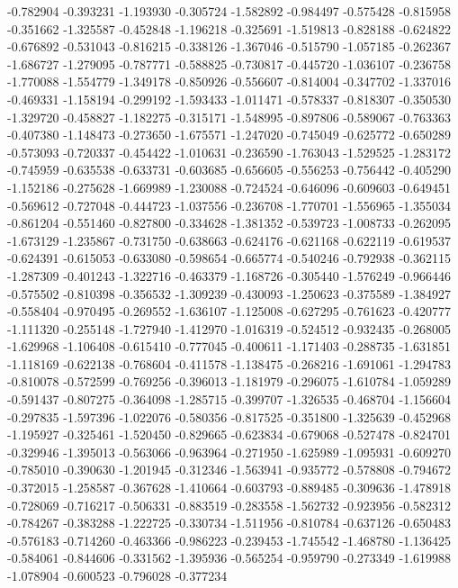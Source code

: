 -0.782904
-0.393231
-1.193930
-0.305724
-1.582892
-0.984497
-0.575428
-0.815958
-0.351662
-1.325587
-0.452848
-1.196218
-0.325691
-1.519813
-0.828188
-0.624822
-0.676892
-0.531043
-0.816215
-0.338126
-1.367046
-0.515790
-1.057185
-0.262367
-1.686727
-1.279095
-0.787771
-0.588825
-0.730817
-0.445720
-1.036107
-0.236758
-1.770088
-1.554779
-1.349178
-0.850926
-0.556607
-0.814004
-0.347702
-1.337016
-0.469331
-1.158194
-0.299192
-1.593433
-1.011471
-0.578337
-0.818307
-0.350530
-1.329720
-0.458827
-1.182275
-0.315171
-1.548995
-0.897806
-0.589067
-0.763363
-0.407380
-1.148473
-0.273650
-1.675571
-1.247020
-0.745049
-0.625772
-0.650289
-0.573093
-0.720337
-0.454422
-1.010631
-0.236590
-1.763043
-1.529525
-1.283172
-0.745959
-0.635538
-0.633731
-0.603685
-0.656605
-0.556253
-0.756442
-0.405290
-1.152186
-0.275628
-1.669989
-1.230088
-0.724524
-0.646096
-0.609603
-0.649451
-0.569612
-0.727048
-0.444723
-1.037556
-0.236708
-1.770701
-1.556965
-1.355034
-0.861204
-0.551460
-0.827800
-0.334628
-1.381352
-0.539723
-1.008733
-0.262095
-1.673129
-1.235867
-0.731750
-0.638663
-0.624176
-0.621168
-0.622119
-0.619537
-0.624391
-0.615053
-0.633080
-0.598654
-0.665774
-0.540246
-0.792938
-0.362115
-1.287309
-0.401243
-1.322716
-0.463379
-1.168726
-0.305440
-1.576249
-0.966446
-0.575502
-0.810398
-0.356532
-1.309239
-0.430093
-1.250623
-0.375589
-1.384927
-0.558404
-0.970495
-0.269552
-1.636107
-1.125008
-0.627295
-0.761623
-0.420777
-1.111320
-0.255148
-1.727940
-1.412970
-1.016319
-0.524512
-0.932435
-0.268005
-1.629968
-1.106408
-0.615410
-0.777045
-0.400611
-1.171403
-0.288735
-1.631851
-1.118169
-0.622138
-0.768604
-0.411578
-1.138475
-0.268216
-1.691061
-1.294783
-0.810078
-0.572599
-0.769256
-0.396013
-1.181979
-0.296075
-1.610784
-1.059289
-0.591437
-0.807275
-0.364098
-1.285715
-0.399707
-1.326535
-0.468704
-1.156604
-0.297835
-1.597396
-1.022076
-0.580356
-0.817525
-0.351800
-1.325639
-0.452968
-1.195927
-0.325461
-1.520450
-0.829665
-0.623834
-0.679068
-0.527478
-0.824701
-0.329946
-1.395013
-0.563066
-0.963964
-0.271950
-1.625989
-1.095931
-0.609270
-0.785010
-0.390630
-1.201945
-0.312346
-1.563941
-0.935772
-0.578808
-0.794672
-0.372015
-1.258587
-0.367628
-1.410664
-0.603793
-0.889485
-0.309636
-1.478918
-0.728069
-0.716217
-0.506331
-0.883519
-0.283558
-1.562732
-0.923956
-0.582312
-0.784267
-0.383288
-1.222725
-0.330734
-1.511956
-0.810784
-0.637126
-0.650483
-0.576183
-0.714260
-0.463366
-0.986223
-0.239453
-1.745542
-1.468780
-1.136425
-0.584061
-0.844606
-0.331562
-1.395936
-0.565254
-0.959790
-0.273349
-1.619988
-1.078904
-0.600523
-0.796028
-0.377234
